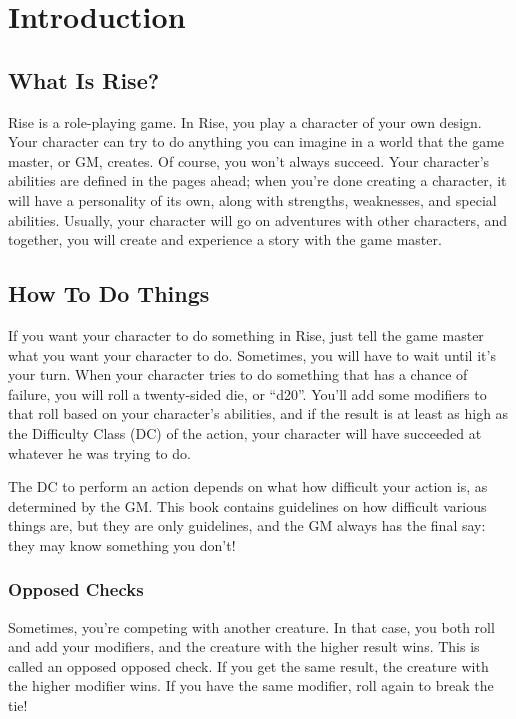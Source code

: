\chapter{Introduction}

\section{What Is Rise?} 
Rise is a role-playing game. In Rise, you play a character of your own design. Your character can try to do anything you can imagine in a world that the game master, or GM, creates. Of course, you won't always succeed. Your character's abilities are defined in the pages ahead; when you're done creating a character, it will have a personality of its own, along with strengths, weaknesses, and special abilities. Usually, your character will go on adventures with other characters, and together, you will create and experience a story with the game master.

\section{How To Do Things}
If you want your character to do something in Rise, just tell the game master what you want your character to do. Sometimes, you will have to wait until it's your turn. When your character tries to do something that has a chance of failure, you will roll a twenty-sided die, or ``d20''. You'll add some modifiers to that roll based on your character's abilities, and if the result is at least as high as the Difficulty Class (DC) of the action, your character will have succeeded at whatever he was trying to do.

The DC to perform an action depends on what how difficult your action is, as determined by the GM. This book contains guidelines on how difficult various things are, but they are only guidelines, and the GM always has the final say: they may know something you don't!

\subsection{Opposed Checks}
Sometimes, you're competing with another creature. In that case, you both roll and add your modifiers, and the creature with the higher result wins. This is called an opposed opposed check. If you get the same result, the creature with the higher modifier wins. If you have the same modifier, roll again to break the tie!

